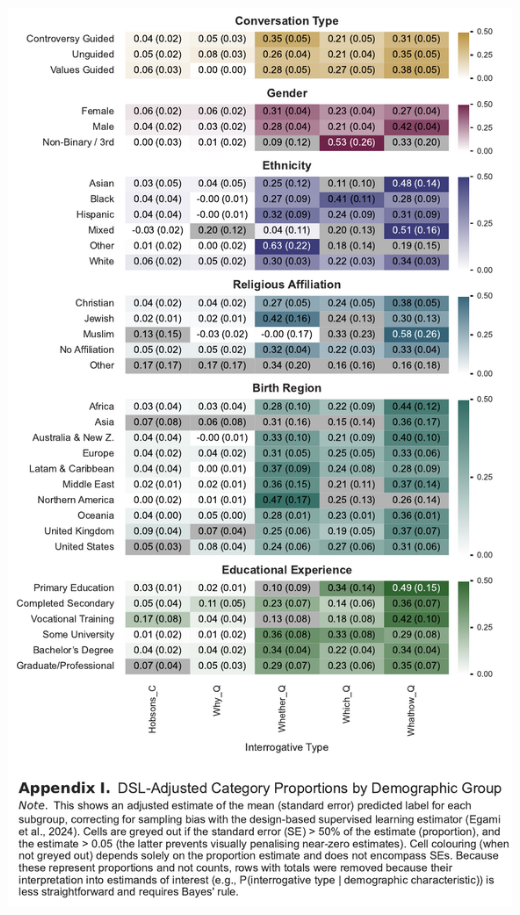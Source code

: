 \documentclass[
  12pt,
]{article}
\begin{document}
\includegraphics{../03_outputs/02_descriptive_analyses/appendix_i.pdf}
\end{document}

